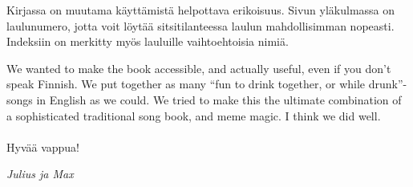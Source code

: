 Kirjassa on muutama käyttämistä helpottava erikoisuus. Sivun yläkulmassa on laulunumero, jotta
voit löytää sitsitilanteessa laulun mahdollisimman nopeasti. Indeksiin on merkitty myös lau\-luil\-le vaihtoehtoisia nimiä.

We wanted to make the book accessible, and actually useful, even if you don’t
speak Finnish. We put together as many “fun to drink together, or while drunk”-songs
in English as we could. We tried to make this the ultimate combination of a
sophisticated traditional song book, and meme magic. I think we did well.
\\
\\
Hyvää vappua!

\vfill
\textit{Julius ja Max}

\newpage
\blankpage
